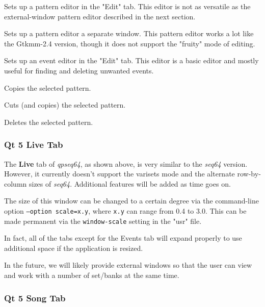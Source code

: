    Sets up a pattern editor in the "Edit" tab.  This editor is not as
   versatile as the external-window pattern editor described in the next
   section.

   Sets up a pattern editor a separate window.  This pattern editor works a lot
   like the Gtkmm-2.4 version, though it does not support the "fruity" mode of
   editing.

   Sets up an event editor in the "Edit" tab.  This editor is a basic editor
   and mostly useful for finding and deleting unwanted events.

   Copies the selected pattern.

   Cuts (and copies) the selected pattern.

   Deletes the selected pattern.

\subsubsection{Qt 5 Live Tab}
\label{subsubsec:qt_portmidi_qt5_live_tab}

   The \textbf{Live} tab of \textsl{qpseq64}, as shown above, is very similar
   to the \textsl{seq64} version.  However, it currently doesn't support the
   varisets mode and the alternate row-by-column sizes of \textsl{seq64}.
   Additional features will be added as time goes on.

   The size of this window can be changed to a certain degree via
   the command-line option \texttt{--option scale=x.y}, where \texttt{x.y} can
   range from 0.4 to 3.0.  This can be made permanent via the
   \texttt{window-scale} setting in the "usr" file.

   In fact, all of the tabs except for the Events tab will expand properly to
   use additional space if the application is resized.

   In the future, we will likely provide external windows so that the user can
   view and work with a number of set/banks at the same time.

\subsubsection{Qt 5 Song Tab}
\label{subsubsec:qt_portmidi_qt5_song_tab}


